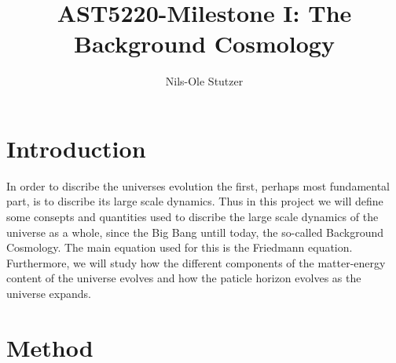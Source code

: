 \documentclass[twocolumn]{aastex62}
\begin{document}
\title{\Large AST5220-Milestone I: The Background Cosmology}

\author{Nils-Ole Stutzer}

\begin{abstract}

\end{abstract}

\section{Introduction} \label{sec:Intro}
In order to discribe the universes evolution the first, perhaps most fundamental
part, is to discribe its large scale dynamics. Thus in this project we will define some consepts and quantities used to discribe the
large scale dynamics of the universe as a whole, since the Big Bang untill
today, the so-called Background Cosmology. The main equation used for this is
the Friedmann equation. Furthermore, we will study how the different components
of the matter-energy content of the universe evolves and how the paticle horizon
evolves as the universe expands.


\section{Method} \label{sec:Method}
\end{document}
